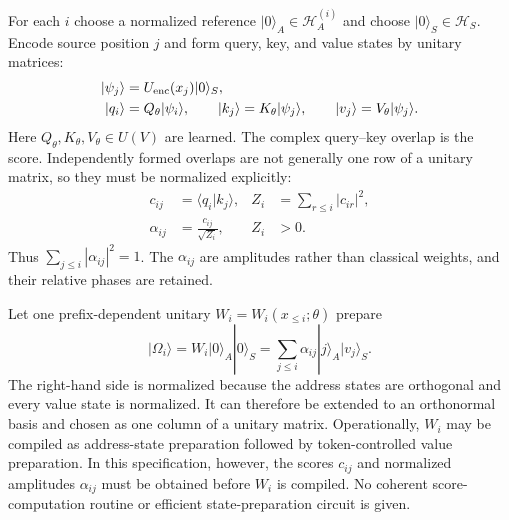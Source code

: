 \documentclass[
  aps,
  reprint,
  superscriptaddress,
  floatfix,
  nofootinbib,
  longbibliography
]{revtex4-2}
\begin{document}
For each $i$ choose a normalized reference $|0\rangle_A\in\mathcal H_A^{(i)}$
and choose $|0\rangle_S\in\mathcal H_S$.  Encode source position $j$ and form
query, key, and value states by unitary matrices:
\begin{equation}
\begin{aligned}
 |\psi_j\rangle&=U_{\rm enc}(x_j)|0\rangle_S,\\
 |q_i\rangle&=Q_\theta|\psi_i\rangle,\qquad
 |k_j\rangle=K_\theta|\psi_j\rangle,\qquad
 |v_j\rangle=V_\theta|\psi_j\rangle .
\end{aligned}
\label{eq:mqa-encoding}
\end{equation}
Here $Q_\theta,K_\theta,V_\theta\in U(V)$ are learned.  The complex
query--key overlap is the score.  Independently formed overlaps are not
generally one row of a unitary matrix, so they must be normalized explicitly:
\begin{equation}
\begin{aligned}
 c_{ij}&=\langle q_i|k_j\rangle,
 &Z_i&=\sum_{r\leq i}|c_{ir}|^2,\\
 \alpha_{ij}&=\frac{c_{ij}}{\sqrt{Z_i}},
 &Z_i&>0 .
\end{aligned}
\label{eq:mqa-scores}
\end{equation}
Thus $\sum_{j\leq i}|\alpha_{ij}|^2=1$.  The $\alpha_{ij}$ are amplitudes
rather than classical weights, and their relative phases are retained.

Let one prefix-dependent unitary $W_i=W_i(x_{\leq i};\theta)$ prepare
\begin{equation}
 |\Omega_i\rangle
 =W_i|0\rangle_A|0\rangle_S
 =\sum_{j\leq i}\alpha_{ij}|j\rangle_A|v_j\rangle_S .
\label{eq:mqa-unitary}
\end{equation}
The right-hand side is normalized because the address states are orthogonal
and every value state is normalized.  It can therefore be extended to an
orthonormal basis and chosen as one column of a unitary matrix.
Operationally, $W_i$ may be compiled as address-state preparation followed by
token-controlled value preparation.  In this specification, however, the
scores $c_{ij}$ and normalized amplitudes $\alpha_{ij}$ must be obtained before
$W_i$ is compiled.  No coherent score-computation routine or efficient
state-preparation circuit is given.
\end{document}
